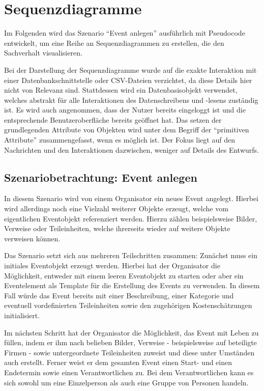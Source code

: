 \chapter{Sequenzdiagramme}
Im Folgenden wird das Szenario \enquote{Event anlegen} ausführlich mit Pseudocode entwickelt, um eine Reihe an Sequenzdiagrammen zu erstellen, die den Sachverhalt visualisieren.

Bei der Darstellung der Sequenzdiagramme wurde auf die exakte Interaktion mit einer Datenbankschnittstelle oder CSV-Dateien verzichtet, da diese Details hier nicht von Relevanz sind. Stattdessen wird ein Datenbasisobjekt verwendet, welches abstrakt für alle Interaktionen des Datenschreibens und -lesens zuständig ist. Es wird auch angenommen, dass der Nutzer bereits eingeloggt ist und die entsprechende Benutzeroberfläche bereits geöffnet hat. Das setzen der grundlegenden Attribute von Objekten wird unter dem Begriff der \enquote{primitiven Attribute} zusammengefasst, wenn es möglich ist. Der Fokus liegt auf den Nachrichten und den Interaktionen dazwischen, weniger auf Details des Entwurfs.

\section{Szenariobetrachtung: Event anlegen}
In diesem Szenario wird von einem Organisator ein neues Event angelegt. Hierbei wird allerdings noch eine Vielzahl weiterer Objekte erzeugt, welche vom eigentlichen Eventobjekt referenziert werden. Hierzu zählen beispielsweise Bilder, Verweise oder Teileinheiten, welche ihrerseits wieder auf weitere Objekte verweisen können.

Das Szenario setzt sich aus mehreren Teilschritten zusammen: Zunächst muss ein initiales Eventobjekt erzeugt werden. Hierbei hat der Organisator die Möglichkeit, entweder mit einem leeren Eventobjekt zu starten oder aber ein Eventelement als Template für die Erstellung des Events zu verwenden. In diesem Fall würde das Event bereits mit einer Beschreibung, einer Kategorie und eventuell vordefinierten Teileinheiten sowie den zugehörigen Kostenschätzungen initialisiert. 

Im nächsten Schritt hat der Organisator die Möglichkeit, das Event mit Leben zu füllen, indem er ihm nach belieben Bilder, Verweise - beispielsweise auf beteiligte Firmen - sowie untergeordnete Teileinheiten zuweist und diese unter Umständen auch erstellt. Ferner weist er dem gesamten Event einen Start- und einen Endetermin sowie einen Verantwortlichen zu. Bei dem Verantwortlichen kann es sich sowohl um eine Einzelperson als auch eine Gruppe von Personen handeln.

